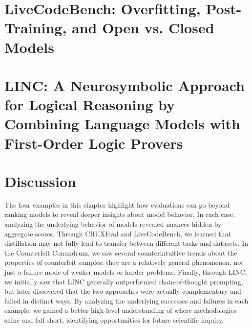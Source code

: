 \section{LiveCodeBench: Overfitting, Post-Training, and Open vs. Closed Models}
\label{sec:livecodebench-beyond-score}


\section{LINC: A Neurosymbolic Approach for Logical Reasoning by Combining Language Models with First-Order Logic Provers}
\label{sec:linc-beyond-score}



\section{Discussion}
The four examples in this chapter highlight how evaluations can go beyond ranking models to reveal deeper
insights about model behavior. In each case, analyzing the underlying behavior of models revealed nuances
hidden by aggregate scores. Through CRUXEval and LiveCodeBench, we learned that distillation may not fully lead to transfer between
different tasks and datasets. In the Counterfeit Conundrum, we saw several counterintuitive trends about
the properties of counterfeit samples: they are a relatively general phenomenon, not just a failure mode
of weaker models or harder problems. Finally, through LINC, we initially saw that LINC generally
outperformed chain-of-thought prompting, but later discovered that the two approaches were actually
complementary and failed in distinct ways. By analyzing the underlying successes and failures in each example, we gained a better high-level understanding
of where methodologies shine and fall short, identifying opportunities for future scientific inquiry.
